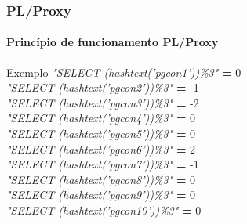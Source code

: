 \documentclass{beamer}
\begin{document}
\begin{frame}
  \frametitle{\textbf{PL/Proxy}}
  \framesubtitle{Princípio de funcionamento PL/Proxy}
  \begin{block}{Exemplo}
    \small{\textit{"SELECT (hashtext('pgcon1'))\%3"} \hspace{0.1cm}\textbf{=}  \hspace{0.1cm} \alert{0}} \\
    \small{\textit{"SELECT (hashtext('pgcon2'))\%3"} \hspace{0.1cm}\textbf{=}  \hspace{0.1cm} \alert{-1}} \\
    \small{\textit{"SELECT (hashtext('pgcon3'))\%3"} \hspace{0.1cm}\textbf{=}  \hspace{0.1cm} \alert{-2}} \\
    \small{\textit{"SELECT (hashtext('pgcon4'))\%3"} \hspace{0.1cm}\textbf{=}  \hspace{0.1cm} \alert{0}} \\
    \small{\textit{"SELECT (hashtext('pgcon5'))\%3"} \hspace{0.1cm}\textbf{=}  \hspace{0.1cm} \alert{0}} \\ 
    \small{\textit{"SELECT (hashtext('pgcon6'))\%3"} \hspace{0.1cm}\textbf{=}  \hspace{0.1cm} \alert{2}} \\ 
    \small{\textit{"SELECT (hashtext('pgcon7'))\%3"} \hspace{0.1cm}\textbf{=}  \hspace{0.1cm} \alert{-1}} \\ 
    \small{\textit{"SELECT (hashtext('pgcon8'))\%3"} \hspace{0.1cm}\textbf{=}  \hspace{0.1cm} \alert{0}} \\
    \small{\textit{"SELECT (hashtext('pgcon9'))\%3"} \hspace{0.1cm}\textbf{=}  \hspace{0.1cm} \alert{0}} \\
    \small{\textit{"SELECT (hashtext('pgcon10'))\%3"} \hspace{0.1cm}\textbf{=} \hspace{0.1cm} \alert{0}} \\
  \end{block}


\end{frame}
\end{document}
